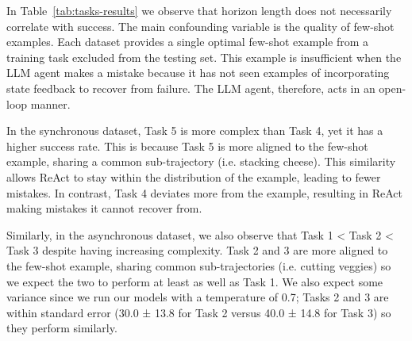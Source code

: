 In Table~\ref{tab:tasks-results} we observe that horizon length does not necessarily correlate with success. The main confounding variable is the quality of few-shot examples. Each dataset provides a single optimal few-shot example from a training task excluded from the testing set. This example is insufficient when the LLM agent makes a mistake because it has not seen examples of incorporating state feedback to recover from failure. The LLM agent, therefore, acts in an open-loop manner.

In the synchronous dataset, Task 5 is more complex than Task 4, yet it has a higher success rate. This is because Task 5 is more aligned to the few-shot example, sharing a common sub-trajectory (i.e. stacking cheese). This similarity allows ReAct to stay within the distribution of the example, leading to fewer mistakes. In contrast, Task 4 deviates more from the example, resulting in ReAct making mistakes it cannot recover from.

Similarly, in the asynchronous dataset, we also observe that Task 1 < Task 2 < Task 3 despite having increasing complexity. Task 2 and 3 are more aligned to the few-shot example, sharing common sub-trajectories (i.e. cutting veggies) so we expect the two to perform at least as well as Task 1. We also expect some variance since we run our models with a temperature of 0.7; Tasks 2 and 3 are within standard error (30.0 ± 13.8 for Task 2 versus 40.0 ± 14.8 for Task 3) so they perform similarly.